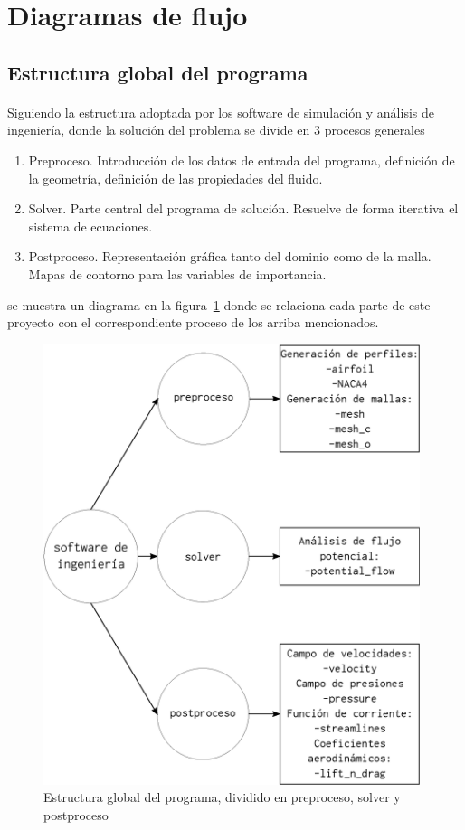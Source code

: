 \documentclass[letterpaper, openright, 12pt]{book}
\begin{document}
    \section{Diagramas de flujo}
    \subsection{Estructura global del programa}
    \paragraph*{}
        Siguiendo la estructura adoptada por los software de simulación y
        análisis de ingeniería, donde la solución del problema se divide en 3
        procesos generales
        \begin{enumerate}
            \item Preproceso. Introducción de los datos de entrada del
                programa, definición de la geometría, definición de las
                propiedades del fluido.
            \item Solver. Parte central del programa de solución. Resuelve de
                forma iterativa el sistema de ecuaciones.
            \item Postproceso. Representación gráfica tanto del dominio como de
                la malla. Mapas de contorno para las variables de importancia.
        \end{enumerate}
        se muestra un diagrama en la figura~\ref{estructura_global} donde se
        relaciona cada parte de este proyecto con el correspondiente proceso
        de los arriba mencionados.

    \begin{figure}[htbp!]
        \centering
        \includegraphics[keepaspectratio, width=110mm]{./img/estructura_global}
        \caption[Estructura global del programa]{Estructura global del programa,
        dividido en preproceso, solver y postproceso}
        \label{estructura_global}
    \end{figure}
\end{document}
